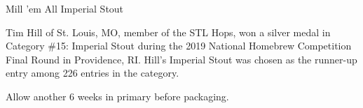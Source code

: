 \begin{recipe}{Mill 'em All Imperial Stout}

\begin{aboutblock}
Tim Hill of St. Louis, MO, member of the STL Hops, won a silver medal
in Category \#15: Imperial Stout during the 2019 National Homebrew Competition
Final Round in Providence, RI. Hill's Imperial Stout was chosen as the runner-up
entry among 226 entries in the category. \sourceaha
\end{aboutblock}


\begin{methodandtiming}
 
\begin{mashsteps}
\end{mashsteps}

\begin{fermentationsteps}
\end{fermentationsteps}

\begin{directions}
Allow another 6 weeks in primary before packaging.
\end{directions}

\end{methodandtiming}

\recipebreak

\begin{ingredientsblock}

\begin{malts}
\end{malts}

\begin{hops}
\end{hops}


\end{ingredientsblock}

\end{recipe}

